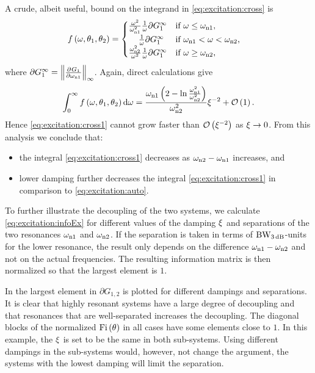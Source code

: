 A crude, albeit useful, bound on the integrand in \eqref{eq:excitation:cross} is
\begin{align}
&f\left(\omega,\theta_1,\theta_2\right)=
  \begin{cases}
   \frac{\omega^2}{\wn[1]^2}
   \frac{1}{\omega}
   \partial G_1^\infty
                                       & \text{if $\omega \leq \wn[1]$,}\\
   \phantom{\frac{\omega^2}{\omega^2}}
   \frac{1}{\omega}
   \partial G_1^\infty
                                       & \text{if $\wn[1] < \omega < \wn[2]$,}\\
   \frac{\wn[2]^2}{\omega^2}
   \frac{1}{\omega}
   \partial G_1^\infty
                                       & \text{if $\omega \geq \wn[2]$,}
  \end{cases}
\end{align}
where $\partial G_1^\infty = \left\|\PartialDerivative{G_1}{\wn[1]}\right\|_\infty$. 
Again, direct calculations give
\begin{align}
\int_0^\infty f\left(\omega,\theta_1,\theta_2\right)\dd\omega = \frac{\wn[1]\left(2-\ln{\frac{\wn[1]^2}{\wn[2]^2}}\right)}{\wn[2]^2}\damping^{-2} + \bigO{1}.
\end{align}
Hence \eqref{eq:excitation:cross1} cannot grow faster than $\bigO{\damping^{-2}}$ as $\damping\rightarrow0$. From this analysis we conclude that:
\begin{itemize}
\item the integral \eqref{eq:excitation:cross1} decreases as $\wn[2]-\wn[1]$ increases, and
\item lower damping further decreases the integral \eqref{eq:excitation:cross1} in comparison to \eqref{eq:excitation:auto}.
\end{itemize}

To further illustrate the decoupling of the two systems, we calculate \eqref{eq:excitation:infoEx} for different values of the damping $\damping$ and separations of the two resonances $\wn[1]$ and $\wn[2]$. If the separation is taken in terms of $\wdB$-units for the lower resonance, the result only depends on the difference $\wn[1]-\wn[2]$ and not on the actual frequencies. The resulting information matrix is then normalized so that the largest element is $1$.

In  the largest element in $\partial G_{1,2}$ is plotted for different dampings and separations. It is clear that highly resonant systems have a large degree of decoupling and that resonances that are well-separated increases the decoupling. 
The diagonal blocks of the normalized $\Fi{\theta}$ in all cases have some elements close to $1$. 
In this example, the $\damping$ is set to be the same in both sub-systems. 
Using different dampings in the sub-systems would, however, not change the argument, the systems with the lowest damping will limit the separation.

